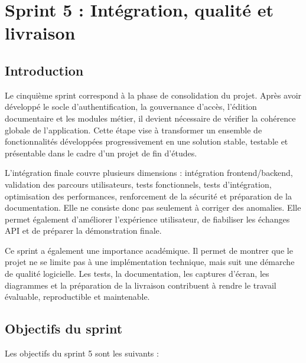 
\chapter{Sprint 5 : Intégration, qualité et livraison}

\section{Introduction}

Le cinquième sprint correspond à la phase de consolidation du projet. Après avoir développé le socle d'authentification, la gouvernance d'accès, l'édition documentaire et les modules métier, il devient nécessaire de vérifier la cohérence globale de l'application. Cette étape vise à transformer un ensemble de fonctionnalités développées progressivement en une solution stable, testable et présentable dans le cadre d'un projet de fin d'études.

L'intégration finale couvre plusieurs dimensions : intégration frontend/backend, validation des parcours utilisateurs, tests fonctionnels, tests d'intégration, optimisation des performances, renforcement de la sécurité et préparation de la documentation. Elle ne consiste donc pas seulement à corriger des anomalies. Elle permet également d'améliorer l'expérience utilisateur, de fiabiliser les échanges API et de préparer la démonstration finale.

Ce sprint a également une importance académique. Il permet de montrer que le projet ne se limite pas à une implémentation technique, mais suit une démarche de qualité logicielle. Les tests, la documentation, les captures d'écran, les diagrammes et la préparation de la livraison contribuent à rendre le travail évaluable, reproductible et maintenable.

\section{Objectifs du sprint}

Les objectifs du sprint 5 sont les suivants :

